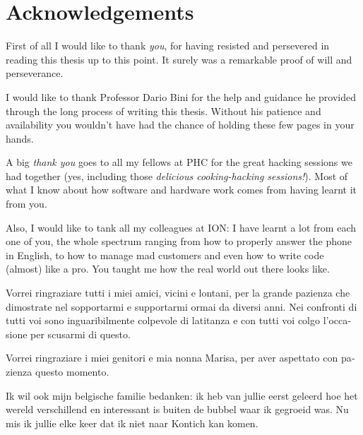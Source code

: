\chapter{Acknowledgements}
First of all I would like to thank \emph{you}, for having resisted and persevered in reading this thesis up to this point. It surely was a remarkable proof of will and perseverance.

I would like to thank Professor Dario Bini for the help and guidance he provided through the long process of writing this thesis. Without his patience and availability you wouldn't have had the chance of holding these few pages in your hands.

A big \emph{thank you} goes to all my fellows at PHC for the great hacking sessions we had together (yes, including those \emph{delicious cooking-hacking sessions!}). Most of what I know about how software and hardware work comes from having learnt it from you.

Also, I would like to tank all my colleagues at ION: I have learnt a lot from each one of you, the whole spectrum ranging from how to properly answer the phone in English, to how to manage mad customers and even how to write code (almost) like a pro. You taught me how the real world out there looks like.

\begin{otherlanguage}{italian}
Vorrei ringraziare tutti i miei amici, vicini e lontani, per la grande pazienza che dimostrate nel sopportarmi e supportarmi ormai da diversi anni. Nei confronti di tutti voi sono inguaribilmente colpevole di latitanza e con tutti voi colgo l'occasione per scusarmi di questo.

Vorrei ringraziare i miei genitori e mia nonna Marisa, per aver aspettato con pazienza questo momento.
\end{otherlanguage}

\begin{otherlanguage}{dutch}
Ik wil ook mijn belgische familie bedanken: ik heb van jullie eerst geleerd hoe het wereld verschillend en interessant is buiten de bubbel waar ik gegroeid was. Nu mis ik jullie elke keer dat ik niet naar Kontich kan komen.
\end{otherlanguage}

